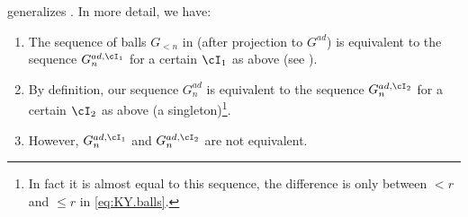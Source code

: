 \documentclass[12pt,a4paper]{amsart}%
\begin{document}
 generalizes . In more detail, we have:
\begin{enumerate}

    \item \label{rem:balls1}
    The sequence of balls $G_{<n}$ in \cite{KYtempered} (after projection to $G^{ad}$) is equivalent to the sequence $G^{ad,\cI_1}_{n}$  for a certain $\cI_1$ as above (see \cite[(4.4)]{KYtempered}).
    \item \label{rem:balls2}
    By definition, our sequence  $G^{ad}_{n}$ is equivalent to the sequence $G^{ad,\cI_2}_{n}$  for a certain $\cI_2$ as above (a singleton)\footnote{In fact it is almost equal to this sequence, the difference is only between $<r$ and $\leq r$ in \eqref{eq:KY.balls}.}.
    \item \label{rem:balls3} However,  $G^{ad,\cI_1}_{n}$  and $G^{ad,\cI_2}_{n}$ are not equivalent.   
\end{enumerate}
\end{document}

